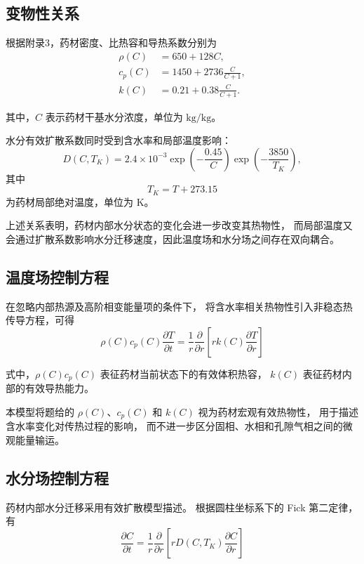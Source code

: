 \documentclass[UTF8,a4paper,12pt]{ctexart}
\begin{document}
\subsection{变物性关系}

根据附录3，药材密度、比热容和导热系数分别为
\begin{align}
\rho(C) &= 650+128C, \\
c_p(C) &= 1450+2736\frac{C}{C+1}, \\
k(C) &= 0.21+0.38\frac{C}{C+1}.
\end{align}

其中，$C$ 表示药材干基水分浓度，单位为 $\mathrm{kg/kg}$。

水分有效扩散系数同时受到含水率和局部温度影响：
\begin{equation}
D(C,T_K)
=
2.4\times10^{-3}
\exp\left(-\frac{0.45}{C}\right)
\exp\left(-\frac{3850}{T_K}\right),
\end{equation}
其中
\begin{equation}
T_K=T+273.15
\end{equation}
为药材局部绝对温度，单位为 K。

上述关系表明，药材内部水分状态的变化会进一步改变其热物性，
而局部温度又会通过扩散系数影响水分迁移速度，因此温度场和水分场之间存在双向耦合。

\subsection{温度场控制方程}

在忽略内部热源及高阶相变能量项的条件下，
将含水率相关热物性引入非稳态热传导方程，可得
\begin{equation}
\boxed{
\rho(C)c_p(C)
\frac{\partial T}{\partial t}
=
\frac{1}{r}
\frac{\partial}{\partial r}
\left[
r k(C)
\frac{\partial T}{\partial r}
\right]
}
\label{eq:heat}
\end{equation}

式中，$\rho(C)c_p(C)$ 表征药材当前状态下的有效体积热容，
$k(C)$ 表征药材内部的有效导热能力。

本模型将题给的 $\rho(C)$、$c_p(C)$ 和 $k(C)$ 视为药材宏观有效热物性，
用于描述含水率变化对传热过程的影响，
而不进一步区分固相、水相和孔隙气相之间的微观能量输运。

\subsection{水分场控制方程}

药材内部水分迁移采用有效扩散模型描述。
根据圆柱坐标系下的 Fick 第二定律，有
\begin{equation}
\boxed{
\frac{\partial C}{\partial t}
=
\frac{1}{r}
\frac{\partial}{\partial r}
\left[
rD(C,T_K)
\frac{\partial C}{\partial r}
\right]
}
\label{eq:mass}
\end{equation}
\end{document}
